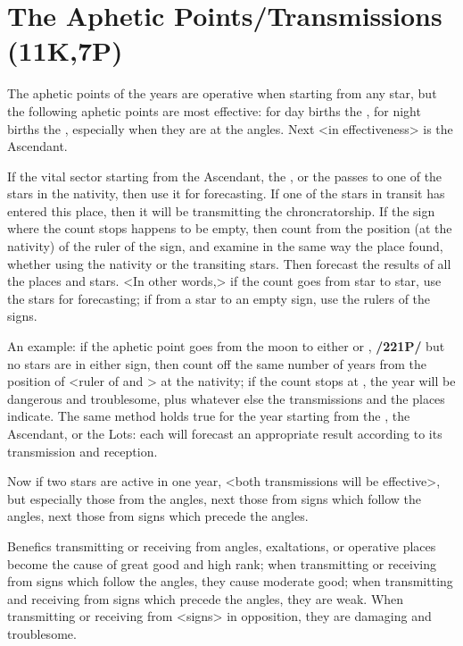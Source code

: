 \section{The Aphetic Points/Transmissions (11K,7P)}

The aphetic points of the years are operative when starting from any star, but the following aphetic points are most effective: for day births the \Sun, for night births the \Moon, especially when they are at the
angles. Next <in effectiveness> is the Ascendant. 

If the vital sector starting from the Ascendant, the \Moon, or the \Sun\xspace passes to one of the stars in the nativity, then use it for forecasting. If one of the stars in transit has entered this place, then it will be transmitting the chroncratorship. If the sign where the count stops happens to be empty, then count from the position (at the nativity) of the ruler of the sign, and examine in the same way the place found, whether using the nativity or the transiting stars. Then forecast the results of all the places and stars. <In other words,> if the count goes from star to star, use the stars for forecasting; if
from a star to an empty sign, use the rulers of the signs.

An example: if the aphetic point goes from the moon to either \Aries\xspace or \Scorpio, \textbf{/221P/} but no stars are
in either sign, then count off the same number of years from the position of \Mars\xspace <ruler of \Aries\xspace and \Scorpio> at the nativity; if the count stops at \Saturn, the year will be dangerous and troublesome, plus whatever else the transmissions and the places indicate. The same method holds true for the year starting from the \Sun, the Ascendant, or the Lots: each will forecast an appropriate result according to its transmission and reception.

Now if two stars are active in one year, <both transmissions will be effective>, but especially those from the angles, next those from signs which follow the angles, next those from signs which precede the angles. 

Benefics transmitting or receiving from angles, exaltations, or operative places become the cause of great good and high rank; when transmitting or receiving from signs which follow the angles, they cause moderate good; when transmitting and receiving from signs which precede the angles, they are weak. When transmitting or receiving from <signs> in opposition, they are damaging and troublesome. 

